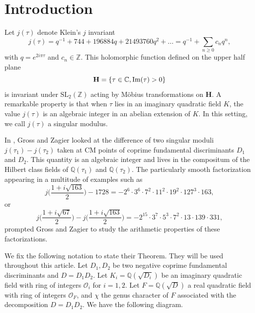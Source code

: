 \documentclass[a4paper,12pt]{article}
\newcommand{\ZZ}{\mathbb{Z}}
\begin{document}
\section{Introduction}
Let $j(\tau)$ denote Klein's $j$ invariant 
\[j(\tau)=q^{-1}+744+196884q+21493760q^2+...=q^{-1}+\sum_{n\geq 0}c_nq^n,\]
with $q=e^{2i\pi\tau}$ and $c_n\in\mathbb{Z}$. This holomorphic function defined on the upper half plane \[\mathbf{H}=\{\tau\in\mathbb{C},\textup{Im}(\tau)>0\}\]
is invariant under $\mathrm{SL}_2(\ZZ)$ acting by M\"{o}bius transformations on $\mathbf{H}$. A remarkable property is that when $\tau$ lies in an imaginary quadratic field $K$, the value $j(\tau)$ is an algebraic integer in an abelian extension of $K$.
In this setting, we call $j(\tau)$ a singular modulus.
\par
In \cite{GrossZagier84}, Gross and Zagier looked at the difference of two singular moduli 
 $j(\tau_1)-j(\tau_2)$ taken at CM points of coprime fundamental discriminants $D_1$ and $D_2$. This quantity is an algebraic integer and lives in the compositum of the Hilbert class fields of $\mathbb{Q}(\tau_1)$ and $\mathbb{Q}(\tau_2)$. The particularly smooth factorization appearing in a multitude of examples such as 
\begin{equation}
j\biggl(\frac{1+i\sqrt{163}}{2}\biggl)-1728=-2^6\cdot3^6\cdot7^2\cdot11^2\cdot19^2\cdot127^3\cdot163,
\end{equation}
or
\begin{equation}\label{vaj j 67,163}
j\biggl(\frac{1+i\sqrt{67}}{2}\biggl)- j\biggl(\frac{1+i\sqrt{163}}{2}\biggl)=-2^{15}\cdot3^7\cdot5^3\cdot7^2\cdot13\cdot139\cdot331,
\end{equation}
 prompted Gross and Zagier to study the arithmetic properties of these factorizations.
\par
We fix the following notation to state their Theorem. They will be used throughout this article. 
Let $D_1,D_2$ be two negative coprime fundamental discriminants and $D=D_1D_2$. Let $K_i=\mathbb{Q}(\sqrt{D_i})$ be an imaginary quadratic field with ring of integers $\mathcal{O}_i$ for $i=1,2$. Let $F=\mathbb{Q}(\sqrt{D})$ a real quadratic field with ring of integers $\mathcal{O}_F$, and $\chi$ the genus character of $F$ associated with the decomposition $D=D_1D_2$. We have the following diagram.
\begin{center}
\end{center}
\end{document}

